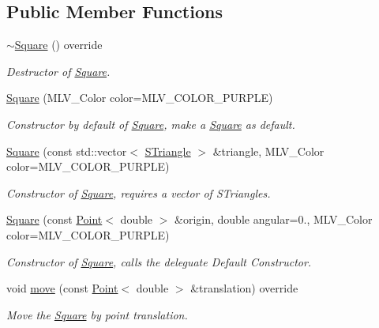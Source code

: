 \subsection*{Public Member Functions}
\begin{DoxyCompactItemize}
\item 
\mbox{\label{classSquare_ab0677a46d02aa78bc0b7be8c06f9dc37}} 
\hyperlink{classSquare_ab0677a46d02aa78bc0b7be8c06f9dc37}{$\sim$\+Square} () override
\begin{DoxyCompactList}\small\item\em Destructor of \hyperlink{classSquare}{Square}. \end{DoxyCompactList}\item 
\hyperlink{classSquare_a6451bb12ac23987428f1a92bf15326b1}{Square} (M\+L\+V\+\_\+\+Color color=M\+L\+V\+\_\+\+C\+O\+L\+O\+R\+\_\+\+P\+U\+R\+P\+LE)
\begin{DoxyCompactList}\small\item\em Constructor by default of \hyperlink{classSquare}{Square}, make a \hyperlink{classSquare}{Square} as default. \end{DoxyCompactList}\item 
\hyperlink{classSquare_ae96b331f8e15352149dbf9ee10ef7cfd}{Square} (const std\+::vector$<$ \hyperlink{classSTriangle}{S\+Triangle} $>$ \&triangle, M\+L\+V\+\_\+\+Color color=M\+L\+V\+\_\+\+C\+O\+L\+O\+R\+\_\+\+P\+U\+R\+P\+LE)
\begin{DoxyCompactList}\small\item\em Constructor of \hyperlink{classSquare}{Square}, requires a vector of S\+Triangles. \end{DoxyCompactList}\item 
\hyperlink{classSquare_aff298af518965b650d52b6366de7f3bb}{Square} (const \hyperlink{classPoint}{Point}$<$ double $>$ \&origin, double angular=0., M\+L\+V\+\_\+\+Color color=M\+L\+V\+\_\+\+C\+O\+L\+O\+R\+\_\+\+P\+U\+R\+P\+LE)
\begin{DoxyCompactList}\small\item\em Constructor of \hyperlink{classSquare}{Square}, calls the deleguate Default Constructor. \end{DoxyCompactList}\item 
void \hyperlink{classSquare_a75b2fd22fc3895b83bc20728afb20b10}{move} (const \hyperlink{classPoint}{Point}$<$ double $>$ \&translation) override
\begin{DoxyCompactList}\small\item\em Move the \hyperlink{classSquare}{Square} by point translation. \end{DoxyCompactList}\item 

\end{DoxyCompactItemize}
